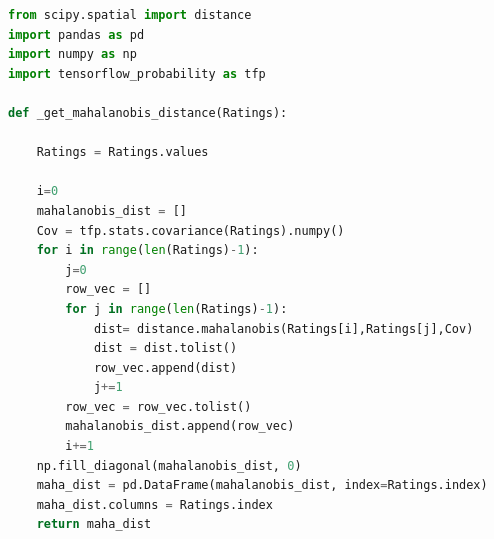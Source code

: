 \begin{lstlisting}[language=Python, caption= Mahalanobis Distanz, label=lst:Mahalanobis Distanz]
from scipy.spatial import distance
import pandas as pd
import numpy as np
import tensorflow_probability as tfp

def _get_mahalanobis_distance(Ratings):

    Ratings = Ratings.values

    i=0
    mahalanobis_dist = []
    Cov = tfp.stats.covariance(Ratings).numpy()
    for i in range(len(Ratings)-1):
        j=0
        row_vec = []
        for j in range(len(Ratings)-1):
            dist= distance.mahalanobis(Ratings[i],Ratings[j],Cov)
            dist = dist.tolist()
            row_vec.append(dist)
            j+=1
        row_vec = row_vec.tolist()
        mahalanobis_dist.append(row_vec)
        i+=1
    np.fill_diagonal(mahalanobis_dist, 0)
    maha_dist = pd.DataFrame(mahalanobis_dist, index=Ratings.index)
    maha_dist.columns = Ratings.index
    return maha_dist
\end{lstlisting}